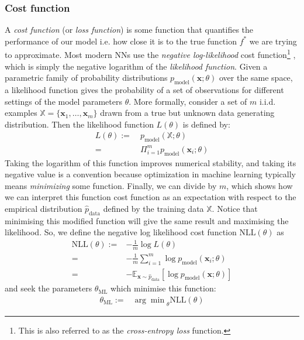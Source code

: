 \documentclass[11pt, a4paper, bibliography=totoc]{report}
\newcommand{\E}[2]{\mathbb{E}_{#1} \left[ #2 \right] }
\newcommand{\x}{\mathbf{x}}
\begin{document}
\subsubsection{Cost function}
A \textit{cost function} (or \textit{loss function}) is some function that quantifies the performance of our model i.e. how close it is to the true function $ f^* $ we are trying to approximate. Most modern NNs use the \textit{negative log-likelihood} cost function\footnote{This is also referred to as the \textit{cross-entropy loss} function.} \cite[p.~138]{Goodfellow-et-al-2016}, which is simply the negative logarithm of the \textit{likelihood function}. Given a parametric family of probability distributions $ p_{\text{model}}(\x ; \theta) $ over the same space, a likelihood function gives the probability of a set of observations for different settings of the model parameters $ \theta $. More formally, consider a set of $ m $ i.i.d. examples $ \mathbb{X} = \{\x_1, \dots, \x_m \} $ drawn from a true but unknown data generating distribution. Then the likelihood function $ L(\theta) $ is defined by:
\begin{align*}
L(\theta) :=&~ p_{\text{model}}(\mathbb{X} ; \theta) \\
	=&~ \Pi_{i=1}^m p_{\text{model}}(\x_i ; \theta)
\end{align*}
Taking the logarithm of this function improves numerical stability, and taking its negative value is a convention because optimization in machine learning typically means \textit{minimizing} some function. Finally, we can divide by $ m $, which shows how we can interpret this function cost function as an expectation with respect to the empirical distribution $ \hat{p}_{\text{data}} $ defined by the training data $ \mathbb{X} $. Notice that minimising this modified function will give the same result and maximising the likelihood. So, we define the negative log likelihood cost function $ \text{NLL}(\theta) $ as
\begin{align} \label{eq:nll}
\text{NLL}(\theta) :=& -\frac{1}{m} \log L(\theta) \nonumber \\
=& -\frac{1}{m} \sum_{i=1}^m \log p_{\text{model}}(\x_i ; \theta) \nonumber \\
=&  -  \E{\x \sim \hat{p}_\text{data}}{\log p_{\text{model}}(\x ; \theta) } 
\end{align}
and seek the parameters $ \theta_{\text{ML}} $ which minimise this function:
\begin{align}
{\theta}_{\text{ML}} :=&{\arg\min}_{\theta} \text{NLL}(\theta) \nonumber
\end{align}
\end{document}

